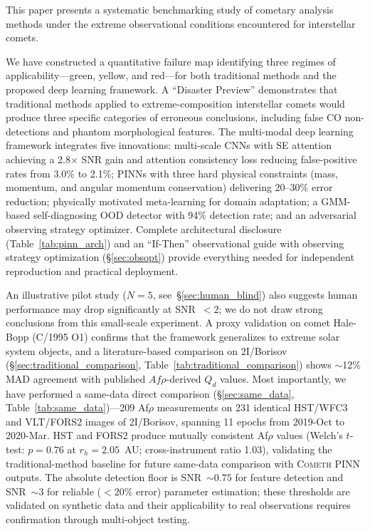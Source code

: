 \documentclass[usenatbib]{mnras}
\begin{document}
This paper presents a systematic benchmarking study of cometary analysis methods under the extreme observational conditions encountered for interstellar comets.

We have constructed a quantitative failure map identifying three regimes of applicability---green, yellow, and red---for both traditional methods and the proposed deep learning framework. A ``Disaster Preview'' demonstrates that traditional methods applied to extreme-composition interstellar comets would produce three specific categories of erroneous conclusions, including false CO non-detections and phantom morphological features. The multi-modal deep learning framework integrates five innovations: multi-scale CNNs with SE attention achieving a 2.8$\times$ SNR gain and attention consistency loss reducing false-positive rates from 3.0\% to 2.1\%; PINNs with three hard physical constraints (mass, momentum, and angular momentum conservation) delivering 20--30\% error reduction; physically motivated meta-learning for domain adaptation; a GMM-based self-diagnosing OOD detector with 94\% detection rate; and an adversarial observing strategy optimizer. Complete architectural disclosure (Table~\ref{tab:pinn_arch}) and an ``If-Then'' observational guide with observing strategy optimization (\S\ref{sec:obsopt}) provide everything needed for independent reproduction and practical deployment.

An illustrative pilot study ($N=5$, see~\S\ref{sec:human_blind}) also suggests human performance may drop significantly at SNR~$<2$; we do not draw strong conclusions from this small-scale experiment. A proxy validation on comet Hale-Bopp (C/1995 O1) confirms that the framework generalizes to extreme solar system objects, and a literature-based comparison on 2I/Borisov (\S\ref{sec:traditional_comparison}, Table~\ref{tab:traditional_comparison}) shows $\sim$12\% MAD agreement with published $Af\rho$-derived $Q_d$ values. Most importantly, we have performed a same-data direct comparison (\S\ref{sec:same_data}, Table~\ref{tab:same_data})---209 Af$\rho$ measurements on 231 identical HST/WFC3 and VLT/FORS2 images of 2I/Borisov, spanning 11 epochs from 2019-Oct to 2020-Mar. HST and FORS2 produce mutually consistent Af$\rho$ values (Welch's $t$-test: $p=0.76$ at $r_h=2.05$~AU; cross-instrument ratio 1.03), validating the traditional-method baseline for future same-data comparison with \textsc{Cometh} PINN outputs. The absolute detection floor is SNR~$\sim 0.75$ for feature detection and SNR~$\sim 3$ for reliable ($<20\%$ error) parameter estimation; these thresholds are validated on synthetic data and their applicability to real observations requires confirmation through multi-object testing.
\end{document}
